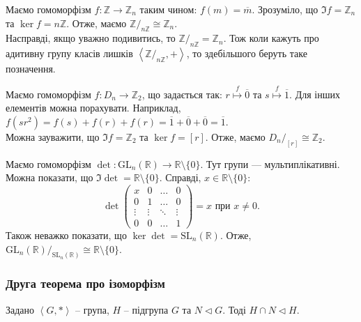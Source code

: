 \documentclass{math_library}
\begin{document}
\begin{example}
Маємо гомоморфізм $f \colon \mathbb{Z} \to \mathbb{Z}_n$ таким чином: $f(m) = \overline{m}$. Зрозуміло, що $\Im f = \mathbb{Z}_n$ та $\ker f = n \mathbb{Z}$. Отже, маємо $\mathbb{Z}/_{n \mathbb{Z}} \cong \mathbb{Z}_n$.\\
Насправді, якщо уважно подивитись, то $\mathbb{Z}/_{n \mathbb{Z}} = \mathbb{Z}_n$. Тож коли кажуть про адитивну групу класів лишків $\left< \mathbb{Z}/_{n \mathbb{Z}}, + \right>$, то здебільшого беруть таке позначення.
\end{example}

\begin{example}
Маємо гомоморфізм $f \colon D_n \to \mathbb{Z}_2$, що задається так: $r \overset{f}{\mapsto} \overline{0}$ та $s \overset{f}{\mapsto} \overline{1}$. Для інших елементів можна порахувати. Наприклад, $f(sr^2) = f(s) + f(r) + f(r)  = \overline{1} + \overline{0} + \overline{0} = \overline{1}$.\\
Можна зауважити, що $\Im f = \mathbb{Z}_2$ та $\ker f = [r]$. Отже, маємо $D_n/_{[r]} \cong \mathbb{Z}_2$.
\end{example}

\begin{example}
Маємо гомоморфізм $\det \colon \mathrm{GL}_n(\mathbb{R}) \to \mathbb{R} \setminus \{0\}$. Тут групи --- мультиплікативні. Можна показати, що $\Im \det = \mathbb{R} \setminus \{0\}$. Справді, $x \in \mathbb{R} \setminus \{0\}$:
\[ \det \begin{pmatrix}
x & 0 & \dots & 0 \\
0 & 1 & \dots & 0 \\
\vdots & \vdots & \ddots & \vdots \\
0 & 0 & \dots & 1 
\end{pmatrix} = x \text{ при } x \neq 0.
\]
Також неважко показати, що $\ker \det = \mathrm{SL}_n(\mathbb{R})$. Отже, ${\mathrm{GL}_n(\mathbb{R})}/_{\mathrm{SL}_n(\mathbb{R})} \cong \mathbb{R} \setminus \{0\}$.
\end{example}

\subsubsection{Друга теорема про ізоморфізм}
\iffalse
\begin{lemma}
Задано $\left< G, * \right>$ -- група, $H$ -- підгрупа $G$ та $N \triangleleft G$. Тоді $H \cap N \triangleleft H$.
\end{lemma}
\end{document}
